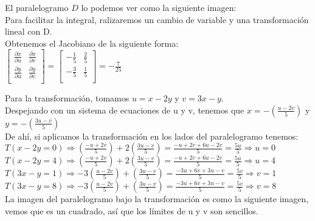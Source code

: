 \documentclass{article}
\begin{document}
\begin{enumerate}
{            \color{azul}
            El paralelogramo $D$ lo podemos ver como la siguiente imagen:\\
        	
        	Para facilitar la integral, ralizaremos un cambio de variable y una transformación lineal con D.\\
        	Obtenemos el Jacobiano de la siguiente forma:\\
	$\begin{bmatrix}
    	\frac{\partial x}{\partial u}  & \frac{\partial x}{\partial v}\\
    	\frac{\partial y}{\partial u} & \frac{\partial y}{\partial v}\\
	\end{bmatrix}
	=
	\begin{bmatrix}
    	-\frac{1}{5}  & \frac{2}{5}\\
    	-\frac{3}{5} & \frac{1}{5}\\
	\end{bmatrix}
	=
	-\frac{7}{25}
	$      	
	
        	Para la transformación, tomamos $u = x-2y$ y $v= 3x-y$.\\ 
        	Despejando con un sistema de ecuaciones de u y v, tenemos que $x = -(\frac{u-2v}{5})$ y  $y = -(\frac{3u-v}{5})$ \\
        	
        	De ahí, si aplicamos la transformación en los lados del paralelogramo tenemos:\\
        	$T(x-2y=0) \Rightarrow (\frac{-u+2v}{5}) + 2(\frac{3u-v}{5}) = \frac{-u+2v+6u-2v}{5} = \frac{5u}{5} \Rightarrow u = 0$\\
        	$T(x-2y=4) \Rightarrow (\frac{-u+2v}{5}) + 2(\frac{3u-v}{5}) = \frac{-u+2v+6u-2v}{5} = \frac{5u}{5} \Rightarrow u = 4$\\
        	$T(3x-y=1) \Rightarrow -3(\frac{u-2v}{5}) + (\frac{3u-v}{5}) = \frac{-3u+6v+3u-v}{5} = \frac{5v}{5} \Rightarrow v = 1$\\
    		$T(3x-y=8) \Rightarrow -3(\frac{u-2v}{5}) + (\frac{3u-v}{5}) = \frac{-3u+6v+3u-v}{5} = \frac{5v}{5} \Rightarrow v = 8$\\
        	
        	La imagen del paralelogramo bajo la transformación es como la siguiente imagen, vemos que es un cuadrado, así que los límites de u y v son sencillos.\\

}
\end{enumerate}
\end{document}

